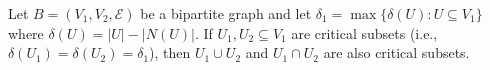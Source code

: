 Let $B = (V_1, V_2, \mathcal{E})$ be a bipartite graph and let $\delta_1 = \max\{\delta(U) : U \subseteq V_1\}$ where $\delta(U) = |U| - |N(U)|$. If $U_1, U_2 \subseteq V_1$ are critical subsets (i.e., $\delta(U_1) = \delta(U_2) = \delta_1$), then $U_1 \cup U_2$ and $U_1 \cap U_2$ are also critical subsets.
